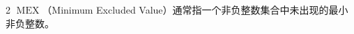 \begin{multicols*}{2}
		$\operatorname{MEX}$（Minimum Excluded Value）通常指一个非负整数集合中未出现的最小非负整数。
%
%
%
%
%

\end{multicols*}
